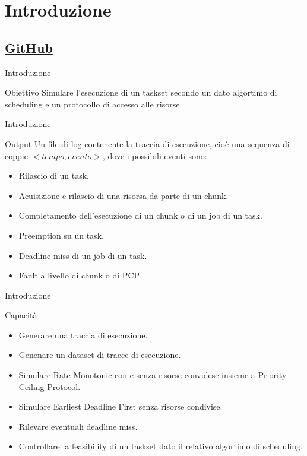 \section{Introduzione}
\subsection{\href{https://github.com/edoardosarri24/real-time-scheduling-simulator.git}{GitHub}}

\begin{frame}{Introduzione}
    \begin{block}{Obiettivo}
        Simulare l'esecuzione di un taskset secondo un dato algortimo di scheduling e un protocollo di accesso alle risorse.
    \end{block}
\end{frame}

\begin{frame}{Introduzione}
    \begin{block}{Output}
        Un file di log contenente la traccia di esecuzione, cioè una sequenza di coppie $<tempo,evento>$, dove i possibili eventi sono:
        \begin{itemize}
            \item Rilascio di un task.
            \item Acuisizione e rilascio di una risorsa da parte di un chunk.
            \item Completamento dell'esecuzione di un chunk o di un job di un task.
            \item Preemption su un task.
            \item Deadline miss di un job di un task.
            \item Fault a livello di chunk o di PCP.
        \end{itemize}
    \end{block}
\end{frame}

\begin{frame}{Introduzione}
    \begin{block}{Capacità}
        \begin{itemize}
            \item Generare una traccia di esecuzione.
            \item Genenare un dataset di tracce di esecuzione.
            \item Simulare Rate Monotonic con e senza risorse convidese insieme a Priority Ceiling Protocol.
            \item Simulare Earliest Deadline First senza risorse condivise.
            \item Rilevare eventuali deadline miss.
            \item Controllare la feasibility di un taskset dato il relativo algortimo di scheduling.
        \end{itemize}
    \end{block}
\end{frame}

